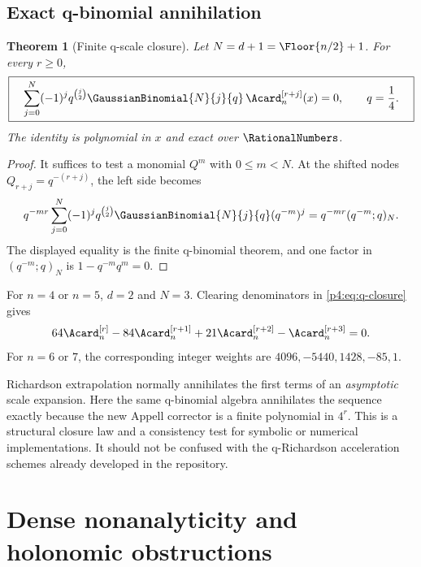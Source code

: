 \documentclass[11pt]{article}
\numberwithin{equation}{section}
\newtheorem{theorem}{Theorem}[section]
\theoremstyle{definition}
\theoremstyle{remark}
\begin{document}
\subsection{Exact q-binomial annihilation}
\begin{theorem}[Finite q-scale closure]
\label{p4:thm:q-closure}
Let $N=d+1=\Floor{n/2}+1$.  For every $r\ge0$,
\begin{equation}
 \boxed{\quad
 \sum_{j=0}^{N}(-1)^jq^{\binom j2}
 \GaussianBinomial{N}{j}{q}\,
 \Acard_n^{[r+j]}(x)=0,
 \qquad q=\frac14.
 \quad}
 \label{p4:eq:q-closure}
\end{equation}
The identity is polynomial in $x$ and exact over $\RationalNumbers$.
\end{theorem}

\begin{proof}
It suffices to test a monomial $Q^m$ with $0\le m<N$.  At the shifted nodes $Q_{r+j}=q^{-(r+j)}$, the left side becomes
\[
 q^{-mr}\sum_{j=0}^{N}(-1)^jq^{\binom j2}
 \GaussianBinomial{N}{j}{q}(q^{-m})^j
 =q^{-mr}(q^{-m};q)_N.
\]
The displayed equality is the finite q-binomial theorem, and one factor in $(q^{-m};q)_N$ is $1-q^{-m}q^m=0$.
\end{proof}

\begin{example}
For $n=4$ or $n=5$, $d=2$ and $N=3$.  Clearing denominators in \eqref{p4:eq:q-closure} gives
\begin{equation}
 64\Acard_n^{[r]}-84\Acard_n^{[r+1]}
 +21\Acard_n^{[r+2]}-\Acard_n^{[r+3]}=0.
 \label{p4:eq:q-closure-example}
\end{equation}
For $n=6$ or $7$, the corresponding integer weights are
$4096,-5440,1428,-85,1$.
\end{example}

\begin{corpusdeductionbox}[title={Exact closure, not asymptotic acceleration}]
Richardson extrapolation normally annihilates the first terms of an \emph{asymptotic} scale expansion.  Here the same q-binomial algebra annihilates the sequence exactly because the new Appell corrector is a finite polynomial in $4^r$.  This is a structural closure law and a consistency test for symbolic or numerical implementations.  It should not be confused with the q-Richardson acceleration schemes already developed in the repository.
\end{corpusdeductionbox}

\section{Dense nonanalyticity and holonomic obstructions}
\label{p4:sec:holonomic}
\end{document}

